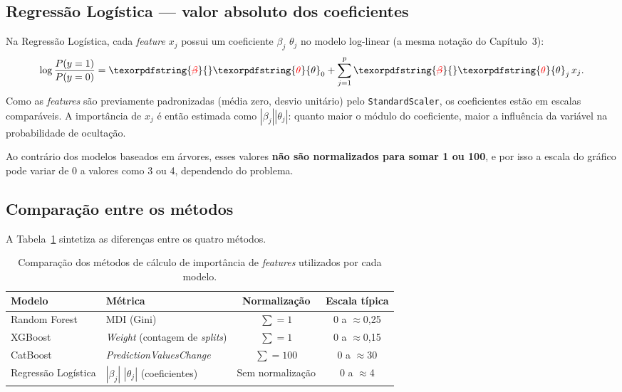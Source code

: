\documentclass[msc]{on} %
\makeatletter
\providecommand{\DIFaddtex}[1]{{\protect\color{red}#1}} %
\providecommand{\DIFdeltex}[1]{{\protect\color{red}\sout{#1}}} %
\providecommand{\DIFaddbegin}{} %
\providecommand{\DIFaddend}{} %
\providecommand{\DIFdelbegin}{} %
\providecommand{\DIFdelend}{} %
\providecommand{\DIFaddFL}[1]{\DIFadd{#1}} %
\providecommand{\DIFdelFL}[1]{\DIFdel{#1}} %
\providecommand{\DIFaddbeginFL}{} %
\providecommand{\DIFaddendFL}{} %
\providecommand{\DIFdelbeginFL}{} %
\providecommand{\DIFdelendFL}{} %
\providecommand{\DIFadd}[1]{\texorpdfstring{\DIFaddtex{#1}}{#1}} %
\providecommand{\DIFdel}[1]{\texorpdfstring{\DIFdeltex{#1}}{}} %
\let\sout@orig\sout %
\renewcommand{\sout}[1]{\ifmmode\text{\sout@orig{\ensuremath{#1}}}\else\sout@orig{#1}\fi} %
\makeatother
\begin{document}
\subsection{Regressão Logística --- valor absoluto dos coeficientes}

Na Regressão Logística, cada \textit{feature} $x_j$ possui um coeficiente \DIFdelbegin \DIFdel{$\beta_j$ }\DIFdelend \DIFaddbegin \DIFadd{$\theta_j$ }\DIFaddend no modelo log-linear \DIFaddbegin \DIFadd{(a mesma notação do Capítulo~3)}\DIFaddend :
%
\[
\log\frac{P(y=1)}{P(y=0)} = \DIFdelbegin \DIFdel{\beta}\DIFdelend \DIFaddbegin \DIFadd{\theta}\DIFaddend _0 + \sum_{j=1}^{p} \DIFdelbegin \DIFdel{\beta}\DIFdelend \DIFaddbegin \DIFadd{\theta}\DIFaddend _j\,x_j.
\]
%
Como as \textit{features} são previamente padronizadas (média zero, desvio unitário) pelo \texttt{StandardScaler}, os coeficientes estão em escalas comparáveis. A importância de $x_j$ é então estimada como \DIFdelbegin \DIFdel{$|\beta_j|$}\DIFdelend \DIFaddbegin \DIFadd{$|\theta_j|$}\DIFaddend : quanto maior o módulo do coeficiente, maior a influência da variável na probabilidade de ocultação.

Ao contrário dos modelos baseados em árvores, esses valores \textbf{não são normalizados para somar 1 ou 100}, e por isso a escala do gráfico pode variar de 0 a valores como 3 ou 4, dependendo do problema.

\subsection{Comparação entre os métodos}

A Tabela~\ref{tab:metodos_importancia} sintetiza as diferenças entre os quatro métodos.

\begin{table}[htbp]
\centering
\caption{Comparação dos métodos de cálculo de importância de \textit{features} utilizados por cada modelo.}
\label{tab:metodos_importancia}
\footnotesize
\begin{tabular}{llcc}
\hline
\textbf{Modelo} & \textbf{Métrica} & \textbf{Normalização} & \textbf{Escala típica} \\
\hline
Random Forest & MDI (Gini) & $\sum = 1$ & 0 a $\approx$0,25 \\
XGBoost & \textit{Weight} (contagem de \textit{splits}) & $\sum = 1$ & 0 a $\approx$0,15 \\
CatBoost & \textit{PredictionValuesChange} & $\sum = 100$ & 0 a $\approx$30 \\
Regressão Logística & \DIFdelbeginFL \DIFdelFL{$|\beta_j|$ }\DIFdelendFL \DIFaddbeginFL \DIFaddFL{$|\theta_j|$ }\DIFaddendFL (coeficientes) & Sem normalização & 0 a $\approx$4 \\
\hline
\end{tabular}
\end{table}
\end{document}
